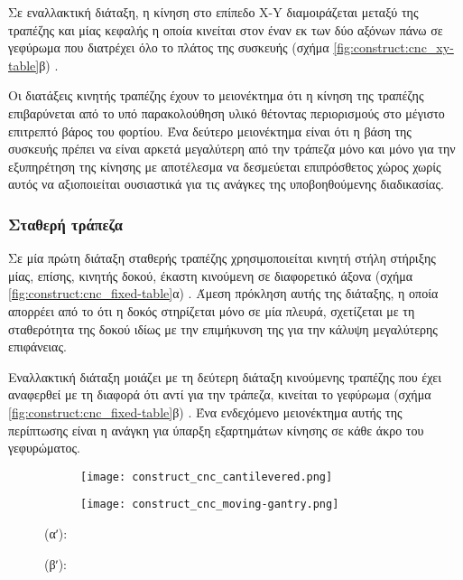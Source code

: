 Σε εναλλακτική διάταξη, η κίνηση στο επίπεδο X-Y διαμοιράζεται μεταξύ της
τραπέζης και μίας κεφαλής η οποία κινείται στον έναν εκ των δύο αξόνων πάνω σε
γεφύρωμα που διατρέχει όλο το πλάτος της συσκευής (σχήμα
\ref{fig:construct:cnc_xy-table}β) \parencite[70]{albert11}.

Οι διατάξεις κινητής τραπέζης έχουν το μειονέκτημα ότι η κίνηση της τραπέζης
επιβαρύνεται από το υπό παρακολούθηση υλικό θέτοντας περιορισμούς στο μέγιστο
επιτρεπτό βάρος του φορτίου.
Ένα δεύτερο μειονέκτημα είναι ότι η βάση της συσκευής πρέπει να είναι αρκετά
μεγαλύτερη από την τράπεζα μόνο και μόνο για την εξυπηρέτηση της κίνησης με
αποτέλεσμα να δεσμεύεται επιπρόσθετος χώρος χωρίς αυτός να αξιοποιείται
ουσιαστικά για τις ανάγκες της υποβοηθούμενης διαδικασίας.


\subsubsection{Σταθερή τράπεζα}

Σε μία πρώτη διάταξη σταθερής τραπέζης χρησιμοποιείται κινητή στήλη στήριξης
μίας, επίσης, κινητής δοκού, έκαστη κινούμενη σε διαφορετικό άξονα (σχήμα
\ref{fig:construct:cnc_fixed-table}α) \parencite[70]{albert11}. Άμεση πρόκληση
αυτής της διάταξης, η οποία απορρέει από το ότι η δοκός στηρίζεται μόνο σε μία
πλευρά, σχετίζεται με τη σταθερότητα της δοκού ιδίως με την επιμήκυνση της για
την κάλυψη μεγαλύτερης επιφάνειας.

Εναλλακτική διάταξη μοιάζει με τη δεύτερη διάταξη κινούμενης τραπέζης που έχει
αναφερθεί με τη διαφορά ότι αντί για την τράπεζα, κινείται το γεφύρωμα (σχήμα
\ref{fig:construct:cnc_fixed-table}β) \parencite[71]{albert11}.
Ένα ενδεχόμενο μειονέκτημα αυτής της περίπτωσης είναι η ανάγκη για ύπαρξη
εξαρτημάτων κίνησης σε κάθε άκρο του γεφυρώματος.

\begin{figure}
    \caption{Διατάξεις σταθερής τραπέζης.
        \label{fig:construct:cnc_fixed-table}}
    \begin{center}
        \begin{subfigure}[b]{0.40\textwidth}
            \texttt{[image: construct\_cnc\_cantilevered.png]}
            \caption{}
        \end{subfigure}
        \begin{subfigure}[b]{0.40\textwidth}
            \texttt{[image: construct\_cnc\_moving-gantry.png]}
            \caption{}
        \end{subfigure}
    \end{center}

    (αʹ): 

    (βʹ): 
\end{figure}


